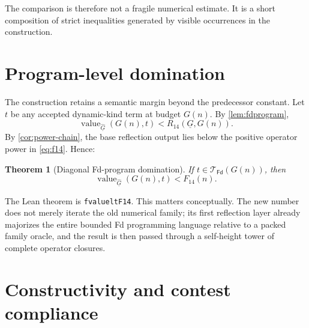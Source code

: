 \documentclass[11pt]{article}
\newtheorem{theorem}{Theorem}[section]
\theoremstyle{definition}
\theoremstyle{remark}
\newcommand{\Fd}{\mathsf{Fd}}
\newcommand{\lean}[1]{\begingroup\def\_{\textunderscore\allowbreak}\ifmmode\text{\ttfamily #1}\else\texttt{#1}\fi\endgroup}
\begin{document}
The comparison is therefore not a fragile numerical estimate.  It is a short
composition of strict inequalities generated by visible occurrences in the
construction.

\section{Program-level domination}

The construction retains a semantic margin beyond the predecessor constant.
Let $t$ be any accepted dynamic-kind term at budget $G(n)$.  By
\cref{lem:fdprogram},
\[
  \operatorname{value}_{\widehat{\underline{G}}}(G(n),t)
  <R_{14}(\underline{G},G(n)).
\]
By \cref{cor:power-chain}, the base reflection output lies below the positive
operator power in \eqref{eq:f14}.  Hence:

\begin{theorem}[Diagonal Fd-program domination]\label{thm:program}
If $t\in\mathcal{T}_{\Fd}(G(n))$, then
\[
  \operatorname{value}_{\widehat{\underline{G}}}(G(n),t)<F_{14}(n).
\]
\end{theorem}

The Lean theorem is \lean{fvalue\_lt\_F14}.  This matters conceptually.  The
new number does not merely iterate the old numerical family; its first
reflection layer already majorizes the entire bounded Fd programming language
relative to a packed family oracle, and the result is then passed through a
self-height tower of complete operator closures.

\section{Constructivity and contest compliance}
\end{document}
